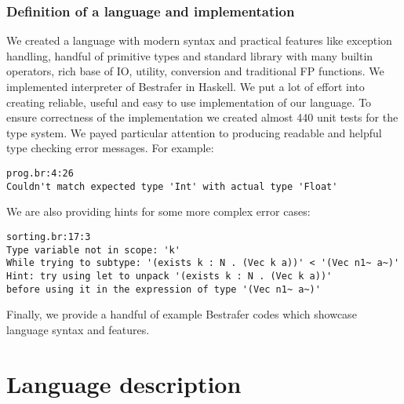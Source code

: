 \documentclass[declaration,shortabstract,english]{iithesis}
\begin{document}
\subsection*{Definition of a language and implementation}
We created a language with modern syntax and practical features like exception handling, handful of primitive types
and standard library with many builtin operators, rich base of IO, utility, conversion and traditional FP functions.
We implemented interpreter of Bestrafer in Haskell. We put a lot of effort into
creating reliable, useful and easy to use implementation of our language.
To ensure correctness of the implementation we created almost 440 unit tests for the type system.
We payed particular attention to producing readable and helpful type checking error messages.
For example:
\begin{verbatim}
prog.br:4:26
Couldn't match expected type 'Int' with actual type 'Float'
\end{verbatim}
We are also providing hints for some more complex error cases:
\begin{verbatim}
sorting.br:17:3
Type variable not in scope: 'k'
While trying to subtype: '(exists k : N . (Vec k a))' < '(Vec n1~ a~)'
Hint: try using let to unpack '(exists k : N . (Vec k a))'
before using it in the expression of type '(Vec n1~ a~)'
\end{verbatim}
Finally, we provide a handful of example Bestrafer codes which showcase language syntax and features.
\chapter{Language description}
\end{document}
